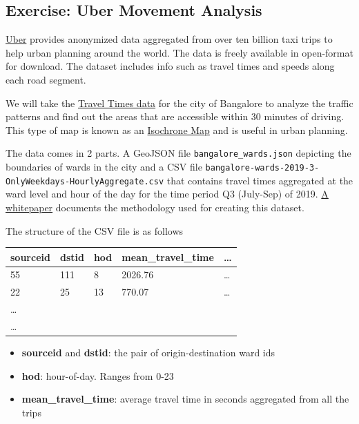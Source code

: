 \documentclass[
  12pt,
  a4paper]{article}
\providecommand{\tightlist}{%
  \setlength{\itemsep}{0pt}\setlength{\parskip}{0pt}}
\begin{document}
\hypertarget{exercise-uber-movement-analysis}{%
\subsection{Exercise: Uber Movement
Analysis}\label{exercise-uber-movement-analysis}}

\href{https://movement.uber.com/}{Uber} provides anonymized data
aggregated from over ten billion taxi trips to help urban planning
around the world. The data is freely available in open-format for
download. The dataset includes info such as travel times and speeds
along each road segment.

We will take the
\href{https://movement.uber.com/explore/bangalore/travel-times/query?lang=hi-IN}{Travel
Times data} for the city of Bangalore to analyze the traffic patterns
and find out the areas that are accessible within 30 minutes of driving.
This type of map is known as an
\href{https://en.wikipedia.org/wiki/Isochrone_map}{Isochrone Map} and is
useful in urban planning.

The data comes in 2 parts. A GeoJSON file \texttt{bangalore\_wards.json}
depicting the boundaries of wards in the city and a CSV file
\texttt{bangalore-wards-2019-3-OnlyWeekdays-HourlyAggregate.csv} that
contains travel times aggregated at the ward level and hour of the day
for the time period Q3 (July-Sep) of 2019.
\href{https://d3i4yxtzktqr9n.cloudfront.net/web-movement/76002ded222a46a02ae89f207e91e335.pdf}{A
whitepaper} documents the methodology used for creating this dataset.

The structure of the CSV file is as follows

\begin{longtable}[]{@{}lllll@{}}
\toprule
\textbf{sourceid} & \textbf{dstid} & \textbf{hod} &
\textbf{mean\_travel\_time} & \ldots{}\tabularnewline
\midrule
\endhead
55 & 111 & 8 & 2026.76 & \ldots{}\tabularnewline
22 & 25 & 13 & 770.07 & \ldots{}\tabularnewline
\ldots{} & & & &\tabularnewline
\ldots{} & & & &\tabularnewline
\bottomrule
\end{longtable}

\begin{itemize}
\tightlist
\item
  \textbf{sourceid} and \textbf{dstid}: the pair of origin-destination
  ward ids
\item
  \textbf{hod}: hour-of-day. Ranges from 0-23
\item
  \textbf{mean\_travel\_time}: average travel time in seconds aggregated
  from all the trips
\end{itemize}
\end{document}
